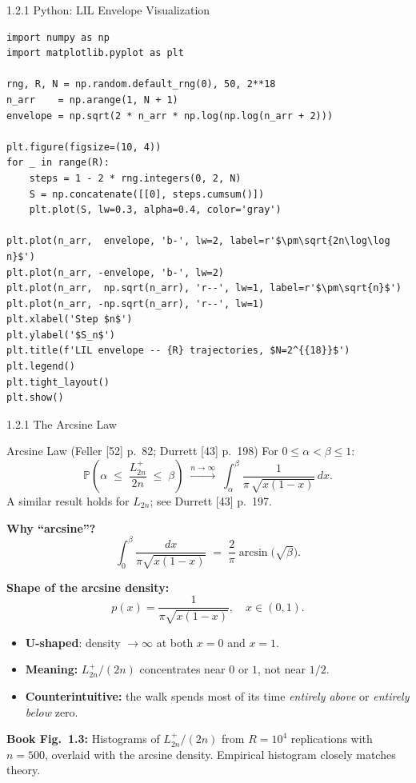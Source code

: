 \documentclass[aspectratio=169,10pt]{beamer}
\begin{document}
\begin{frame}[fragile]{1.2.1 Python: LIL Envelope Visualization}

\begin{lstlisting}[style=python, caption={Plot random walk trajectories with LIL envelope}]
import numpy as np
import matplotlib.pyplot as plt

rng, R, N = np.random.default_rng(0), 50, 2**18
n_arr    = np.arange(1, N + 1)
envelope = np.sqrt(2 * n_arr * np.log(np.log(n_arr + 2)))

plt.figure(figsize=(10, 4))
for _ in range(R):
    steps = 1 - 2 * rng.integers(0, 2, N)
    S = np.concatenate([[0], steps.cumsum()])
    plt.plot(S, lw=0.3, alpha=0.4, color='gray')

plt.plot(n_arr,  envelope, 'b-', lw=2, label=r'$\pm\sqrt{2n\log\log n}$')
plt.plot(n_arr, -envelope, 'b-', lw=2)
plt.plot(n_arr,  np.sqrt(n_arr), 'r--', lw=1, label=r'$\pm\sqrt{n}$')
plt.plot(n_arr, -np.sqrt(n_arr), 'r--', lw=1)
plt.xlabel('Step $n$')
plt.ylabel('$S_n$')
plt.title(f'LIL envelope -- {R} trajectories, $N=2^{{18}}$')
plt.legend()
plt.tight_layout()
plt.show()
\end{lstlisting}

\end{frame}

\begin{frame}[allowframebreaks]{1.2.1 The Arcsine Law}

  \begin{block}{Arcsine Law (Feller [52] p.~82; Durrett [43] p.~198)}
    For $0 \le \alpha < \beta \le 1$:
    \[
      \mathbb{P}\!\left(
        \alpha \;\le\; \frac{L^+_{2n}}{2n} \;\le\; \beta
      \right)
      \;\xrightarrow{n \to \infty}\;
      \int_{\alpha}^{\beta}
      \frac{1}{\pi\,\sqrt{x(1-x)}}\,dx.
      \tag{1.2.1}
    \]
    A similar result holds for $L_{2n}$; see Durrett [43] p.~197.
  \end{block}

  \textbf{Why ``arcsine''?}
  \[
    \int_{0}^{\beta} \frac{dx}{\pi\sqrt{x(1-x)}}
    \;=\; \frac{2}{\pi}\arcsin\!\bigl(\sqrt{\beta}\bigr).
  \]

  \framebreak

  \textbf{Shape of the arcsine density:}
  \[
    p(x) = \frac{1}{\pi\sqrt{x(1-x)}}, \quad x \in (0,1).
  \]
  \begin{itemize}
    \item \textbf{U-shaped}: density $\to\infty$ at both $x=0$ and $x=1$.
    \item \textbf{Meaning:} $L^+_{2n}/(2n)$ concentrates near $0$ or $1$,
      not near $1/2$.
    \item \textbf{Counterintuitive:} the walk spends most of its time
      \emph{entirely above} or \emph{entirely below} zero.
  \end{itemize}

  \textbf{Book Fig.~1.3:} Histograms of $L^+_{2n}/(2n)$ from
  $R = 10^4$ replications with $n = 500$, overlaid with the arcsine
  density. Empirical histogram closely matches theory.

\end{frame}
\end{document}
